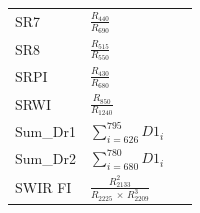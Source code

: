 \documentclass[remotesensing,article,accept,moreauthors,pdftex]{Definitions/mdpi}
\begin{document}
\begin{paracol}{2}
\begin{specialtable}[H]
{\begin{tabular}{lll}
		SR7             & $\frac{R_{440}}{R_{690}}$                                                                            &~\cite{lichtenthaler1996}      \\
		SR8             & $\frac{R_{515}}{R_{550}}$                                                                            &~\cite{hernandez-clemente2012} \\
		SRPI            & $\frac{R_{430}}{R_{680}}$                                                                            &~\cite{penuelasj.1995}         \\
		SRWI            & $\frac{R_{850}}{R_{1240}}$\vspace{6pt}                                                                                                                                                      &~\cite{zarco-tejada2003}      \\
		Sum\_Dr1        & $\sum_{i=626}^{795} D1_i$\vspace{6pt}                                                                            &~\cite{elvidge1995}            \\
		Sum\_Dr2        & $\sum_{i=680}^{780} D1_i$                                                                            &~\cite{filella1994}            \\
		SWIR FI         & $\frac{R_{2133}^2}{R_{2225} \,\times\, R_{2209}^3}$                                                      &~\cite{levin2007}              \\

\end{tabular}}
\end{specialtable}
\end{paracol}
\end{document}
